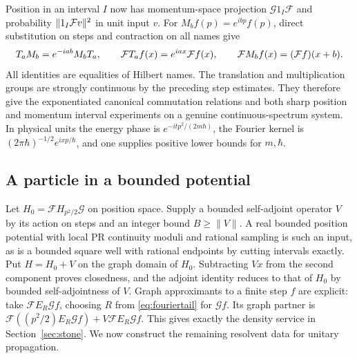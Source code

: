 Position in an interval $I$ now has momentum-space projection
$\mathcal G1_I\mathcal F$ and probability $\|1_I{\cal F}v\|^2$ in unit
input $v$. For $M_b f(p)=e^{ibp}f(p)$, direct substitution on steps
and contraction on all names give
\[
 T_aM_b=e^{-iab}M_bT_a,\qquad
 {\cal F}T_af(x)=e^{iax}{\cal F}f(x),\qquad
 {\cal F}M_bf(x)=({\cal F}f)(x+b).
\]
All identities are equalities of Hilbert names. The translation and
multiplication groups are strongly continuous by the preceding step
estimates. They therefore give the exponentiated canonical commutation
relations and both sharp position and momentum interval experiments
on a genuine continuous-spectrum system. In physical units the energy
phase is $e^{-itp^2/(2m\hbar)}$, the Fourier kernel is
$(2\pi\hbar)^{-1/2}e^{ixp/\hbar}$, and one supplies positive lower
bounds for $m,\hbar$.

\subsection{A particle in a bounded potential}

Let $H_0=\mathcal F H_{p^2/2}\mathcal G$ on position space. Supply a
bounded self-adjoint operator $V$ by its action on steps and an integer
bound $B\ge\|V\|$. A real bounded position potential with local PR
continuity moduli and rational sampling is such an input, as is a
bounded square well with rational endpoints by cutting intervals
exactly. Put $H=H_0+V$ on the graph domain of $H_0$.
Subtracting $Vx$ from the second component proves closedness, and the
adjoint identity reduces to that of $H_0$ by bounded self-adjointness
of $V$. Graph approximants to a finite step $f$ are explicit:
take $\mathcal F E_R\mathcal G f$, choosing $R$ from
\eqref{eq:fouriertail} for $\mathcal G f$. Its graph partner is
$\mathcal F((p^2/2) E_R\mathcal G f)+V\mathcal F E_R\mathcal G f$.
This gives exactly the density service in Section~\ref{sec:stone}.
We now construct the remaining resolvent data for unitary propagation.

